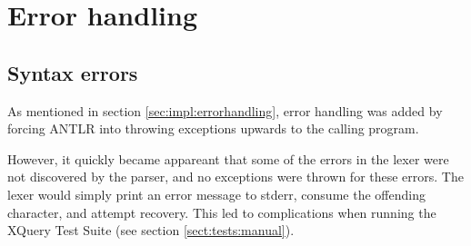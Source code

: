 \section{Error handling}
\subsection{Syntax errors}
\label{sect:error_handling:syntax_errors}
As mentioned in section \ref{sec:impl:errorhandling}, error handling was added
by forcing ANTLR into throwing exceptions upwards to the calling program.

However, it quickly became appareant that some of the errors in the lexer were
not discovered by the parser, and no exceptions were thrown for these errors. The
lexer would simply print an error message to stderr, consume the offending
character, and attempt recovery. This led to complications when running the
XQuery Test Suite (see section \ref{sect:tests:manual}).

